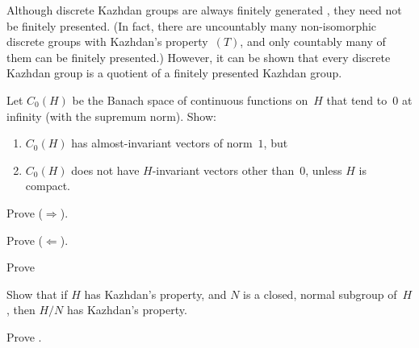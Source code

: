  \begin{warn} \label{TIsQuotOfFP}
 Although discrete Kazhdan groups are always finitely generated , they need not be finitely presented. (In fact, there are uncountably many non-isomorphic discrete groups with Kazhdan's property~$(T)$, and only countably many of them can be finitely presented.) However, it can be shown that every discrete Kazhdan group is a quotient of a finitely presented Kazhdan group.
 \end{warn}


\begin{exercises}

\item \label{BanachNoInvt}
Let $C_0(H)$ be the Banach space of continuous functions on~$H$ that tend to~$0$ at infinity (with the supremum norm). Show:
	\begin{enumerate}
	\item $C_0(H)$ has almost-invariant vectors of norm~$1$, 
	but
	\item $C_0(H)$ does not have $H$-invariant vectors other than~$0$, unless $H$ is compact.
	\end{enumerate}

\item \label{Cpct->Kazhdan+amenable}
Prove ($\Rightarrow$).
 
\item \label{Cpct<-Kazhdan+amenable}
Prove ($\Leftarrow$).

\item \label{KazhdanEasy-quotientPf}
Prove 

\item \label{KazhdanQuotient}
Show that if $H$ has Kazhdan's property, and $N$ is a closed, normal subgroup of~$H$, then $H/N$ has Kazhdan's property.

\item \label{KazhdanEasy-AbelPf}
Prove .


\end{exercises}
